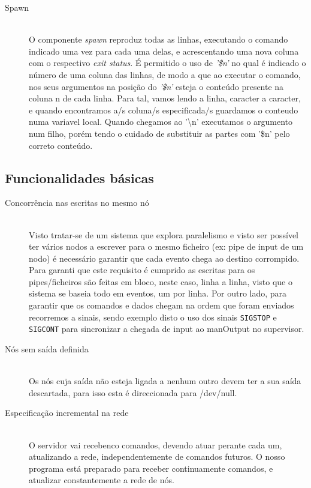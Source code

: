 \documentclass[12pt]{article}
\begin{document}
\begin{description}
\item[Spawn] \hfill \\
    O componente \textit{spawn} reproduz todas as linhas, executando o comando indicado uma vez para cada uma delas, e acrescentando uma nova coluna com o respectivo \textit{exit status}. É permitido o uso de \textit{'\$n'} no qual é indicado o número de uma coluna das linhas, de modo a que ao executar o comando, nos seus argumentos na posição do \textit{'\$n'} esteja o conteúdo presente na coluna n de cada linha. Para tal, vamos lendo a linha, caracter a caracter, e quando encontramos a/s coluna/s especificada/s guardamos o conteudo numa variavel local. Quando chegamos ao '\textbackslash n' executamos o argumento num filho, porém tendo o cuidado de substituir as partes com '\$n' pelo correto conteúdo.  

\end{description} 

\newpage
\subsection{Funcionalidades básicas}
\begin{description} 

\item[Concorrência nas escritas no mesmo nó] \hfill \\
    Visto tratar-se de um sistema que explora paralelismo e visto ser possível ter vários nodos a escrever para o mesmo ficheiro (ex: pipe de input de um nodo) é necessário garantir que cada evento chega ao destino corrompido. Para garanti que este requisito é cumprido as escritas para os pipes/ficheiros são feitas em bloco, neste caso, linha a linha, visto que o sistema se baseia todo em eventos, um por linha. Por outro lado, para garantir que os comandos e dados chegam na ordem que foram enviados recorremos a sinais, sendo exemplo disto o uso dos sinais \texttt{SIGSTOP} e \texttt{SIGCONT} para sincronizar a chegada de input ao manOutput no supervisor.

\item[Nós sem saída definida] \hfill \\
Os nós cuja saída não esteja ligada a nenhum outro devem ter a sua saída descartada, para isso esta é direccionada para /dev/null.

\item[Especificação incremental na rede] \hfill \\
O servidor vai recebenco comandos, devendo atuar perante cada um, atualizando a rede, independentemente de comandos futuros. O nosso programa está preparado para receber continuamente comandos, e atualizar constantemente a rede de nós.

\end{description}
\end{document}
